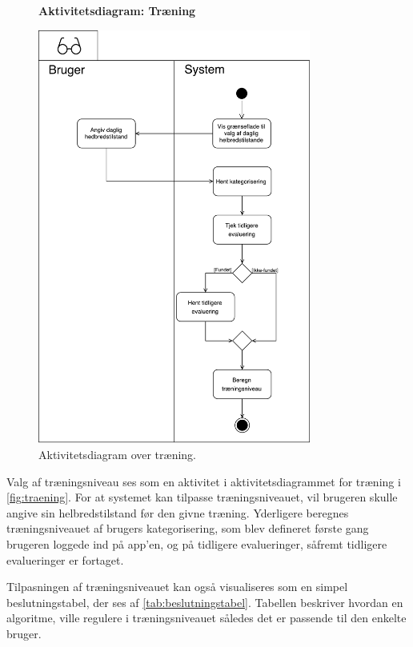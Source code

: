 \begin{figure} [H]
\centering
\textbf{Aktivitetsdiagram: Træning}\par\medskip
\includegraphics[width=0.8\textwidth]{figures/aktivitetsdiagram/Tilpasningaftraeningsniveau}
\caption{Aktivitetsdiagram over træning.}
\label{fig:traeningsniveau}
\end{figure}

\noindent
Valg af træningsniveau ses som en aktivitet i aktivitetsdiagrammet for træning i \autoref{fig:traening}. For at systemet kan tilpasse træningsniveauet, vil brugeren skulle angive sin helbredstilstand før den givne træning. Yderligere beregnes træningsniveauet af brugers kategorisering, som blev defineret første gang brugeren loggede ind på app'en, og på tidligere evalueringer, såfremt tidligere evalueringer er fortaget.


Tilpasningen af træningsniveauet kan også visualiseres som en simpel beslutningstabel, der ses af \autoref{tab:beslutningstabel}. Tabellen beskriver hvordan en algoritme, ville regulere i træningsniveauet således det er passende til den enkelte bruger.  

